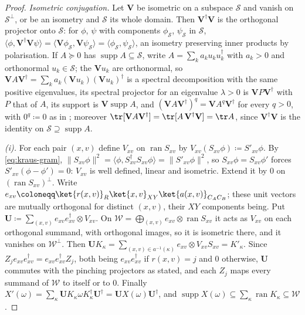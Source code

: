 \begin{proof}
\emph{Isometric conjugation.} Let $\mathbf V$ be isometric on a subspace
$\mathcal{S}$ and vanish on $\mathcal{S}^{\perp}$, or be an isometry and
$\mathcal{S}$ its whole domain. Then $\mathbf V^{\dagger}\mathbf V$ is the
orthogonal projector onto $\mathcal{S}$: for $\phi$, $\psi$ with components
$\phi_{\mathcal{S}}$, $\psi_{\mathcal{S}}$ in $\mathcal{S}$,
$\langle\phi,\mathbf V^{\dagger}\mathbf V\psi\rangle
=\langle\mathbf V\phi_{\mathcal{S}},\mathbf V\psi_{\mathcal{S}}\rangle
=\langle\phi_{\mathcal{S}},\psi_{\mathcal{S}}\rangle$, an isometry preserving
inner products by polarisation. If $A\succeq0$ has
$\operatorname{supp}A\subseteq\mathcal{S}$,
write $A=\sum_ka_ku_ku_k^{\dagger}$ with $a_k>0$ and orthonormal
$u_k\in\mathcal{S}$; the $\mathbf Vu_k$ are orthonormal, so
$\mathbf VA\mathbf V^{\dagger}=\sum_ka_k(\mathbf Vu_k)(\mathbf Vu_k)^{\dagger}$
is a spectral decomposition with the same positive eigenvalues, its spectral
projector for an eigenvalue $\lambda>0$ is $\mathbf VP\mathbf V^{\dagger}$
with $P$ that of $A$, its support is $\mathbf V\operatorname{supp}A$, and
$(\mathbf VA\mathbf V^{\dagger})^{q}=\mathbf VA^{q}\mathbf V^{\dagger}$ for
every $q>0$, with $0^{q}\coloneqq0$ as in ;
moreover $\tr[\mathbf VA\mathbf V^{\dagger}]=\tr[A\,\mathbf V^{\dagger}
\mathbf V]=\tr A$, since $\mathbf V^{\dagger}\mathbf V$ is the identity
on $\mathcal{S}\supseteq\operatorname{supp}A$.

\emph{(i).} For each pair $(x,v)$ define $V_{xv}$ on
$\operatorname{ran}S_{xv}$ by $V_{xv}(S_{xv}\phi)\coloneqq S'_{xv}\phi$.
By \eqref{eq:kraus-gram},
$\|S_{xv}\phi\|^{2}=\langle\phi,S^{\dagger}_{xv}S_{xv}\phi\rangle
=\|S'_{xv}\phi\|^{2}$, so $S_{xv}\phi=S_{xv}\phi'$ forces
$S'_{xv}(\phi-\phi')=0$: $V_{xv}$ is well defined, linear and isometric.
Extend it by $0$ on $(\operatorname{ran}S_{xv})^{\perp}$. Write
$e_{xv}\coloneqq\ket{r(x,v)}_R\ket{x,v}_{XY}\ket{a(x,v)}_{C_AC_B}$; these
unit vectors are mutually orthogonal for distinct $(x,v)$, their $XY$
components being. Put $\mathbf U\coloneqq\sum_{(x,v)}e_{xv}e_{xv}^{\dagger}
\otimes V_{xv}$. On $\mathcal{W}=\bigoplus_{(x,v)}e_{xv}\otimes
\operatorname{ran}S_{xv}$ it acts as $V_{xv}$ on each orthogonal summand,
with orthogonal images, so it is isometric there, and it vanishes on
$\mathcal{W}^{\perp}$. Then $\mathbf UK_{\kappa}
=\sum_{(x,v)\in a^{-1}(\kappa)}e_{xv}\otimes V_{xv}S_{xv}=K'_{\kappa}$. Since
$Z_je_{xv}e_{xv}^{\dagger}=e_{xv}e_{xv}^{\dagger}Z_j$, both being
$e_{xv}e_{xv}^{\dagger}$ if $r(x,v)=j$ and $0$ otherwise, $\mathbf U$
commutes with the pinching projectors as stated, and each $Z_j$ maps every
summand of $\mathcal{W}$ to itself or to $0$. Finally
$X'(\omega)=\sum_{\kappa}\mathbf UK_{\kappa}\omega K_{\kappa}^{\dagger}
\mathbf U^{\dagger}=\mathbf UX(\omega)\mathbf U^{\dagger}$, and
$\operatorname{supp}X(\omega)\subseteq\sum_{\kappa}\operatorname{ran}K_{\kappa}
\subseteq\mathcal{W}$.


\end{proof}
